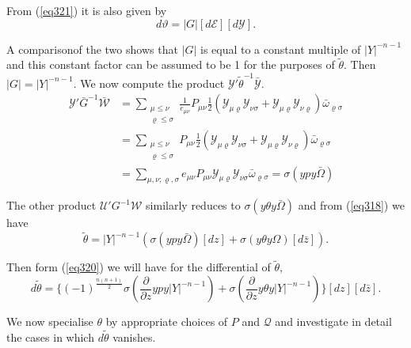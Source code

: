 From (\ref{eq321}) it is also given by 
 $$
 d \vartheta = |G| [d \mathcal{E} ] [d\mathscr{Y}].
 $$
 
 A comparison\pageoriginale of the two shows that $|G|$ is equal to a
 constant  multiple of $|Y|^{-n-1}$ and this constant factor can be
 assumed to  be 1 for the purposes of $\tilde{\theta }$. Then $|G| =
 |Y|^{-n-1}$. We now compute the product $\mathscr{Y}' \tilde{\theta 
 }^{-1} \bar{\mathscr{Y}}$. 
 \begin{align*}
\mathcal{Y}' \bar{G}^{-1} \bar{\mathscr{W}} & =
\sum_{\substack{\mu\leq  \nu \\ \varrho \leq  \sigma }}
\frac{1}{e_{\mu \nu }} P_{\mu \nu } \frac{1}{2}(\mathcal{Y}_{\mu
  \varrho } \mathcal{Y}_{\nu \sigma } + \mathcal{Y}_{\mu \varrho }
\mathcal{Y}_{\nu \varrho  }) \bar {\omega}_{\varrho \sigma}\\ 
& = \sum_{\substack{\mu\leq  \nu \\ \varrho \leq  \sigma }}  P_{\mu
  \nu } \frac{1}{2}(\mathcal{Y}_{\mu \varrho } \mathcal{Y}_{\nu \sigma
} + \mathcal{Y}_{\mu \varrho } \mathcal{Y}_{\nu \varrho  }) \bar
        {\omega}_{\varrho \sigma}\\ 
& = \sum_{\mu,  \nu ; \varrho ,  \sigma } e_{\mu \nu } P_{\mu \nu }
        \mathcal{Y}_{\mu \varrho } \mathcal{Y}_{\nu \sigma }  \bar
                {\omega}_{\varrho \sigma} = \sigma (y p y \bar
                {\Omega})
 \end{align*} 
 
 The other product $\mathscr{U}' G^{-1} \mathscr{W}$ similarly reduces
 to $\sigma (y \theta y \bar {\Omega})$ and from (\ref{eq318}) we have  
 \begin{equation*}
\tilde{\theta} = |Y|^{-n-1} (\sigma (y p y \bar {\Omega}) [dz] +
\sigma (y \theta y  \Omega) [d\bar z]). \tag{329}\label{eq329}  
 \end{equation*} 
 
 Then form (\ref{eq320}) we will have for the differential of
 $\tilde{\theta}$,  
 \begin{equation*}
d \tilde{\theta} = \{  (-1)^{\frac{n (n + 1)}{2}} \sigma
(\frac{\partial}{\partial z} y p y |Y|^{-n-1}) + \sigma
(\frac{\partial}{\partial z} y \theta y |Y|^{-n-1})\} [dz ] [d
  \bar{z}]. \tag{330}\label{eq330}  
 \end{equation*} 
 
 We now specialise $\theta$ by appropriate choices of $P$ and
 $\mathcal{Q}$ and investigate in detail the cases in which $d
 \tilde{\theta}$ vanishes. 
 
